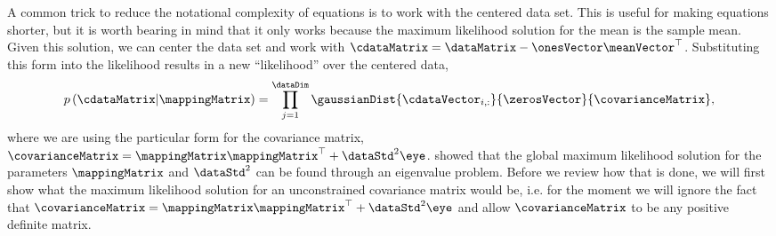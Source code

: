 A common trick to reduce the notational complexity of equations is to work with the centered data set. This is useful for making equations shorter, but it is worth bearing in mind that it only works because the maximum likelihood solution for the mean is the sample mean. Given this solution, we can center the
data set and work with $\cdataMatrix = \dataMatrix -
\onesVector\meanVector^\top$. Substituting this form into the likelihood results in a new ``likelihood'' over the centered data,
\[
p\left(\cdataMatrix|\mappingMatrix\right)=\prod_{j=1}^{\dataDim}\gaussianDist{\cdataVector_{i,:}}{\zerosVector}{\covarianceMatrix},
\]
where we are using the particular form for the covariance matrix, $
\covarianceMatrix=\mappingMatrix\mappingMatrix^{\top}+\dataStd^{2}\eye
$. \citet{Tipping:probpca99} showed that the global maximum likelihood
solution for the parameters $\mappingMatrix$ and $\dataStd^2$ can be
found through an eigenvalue problem. Before we review how that is
done, we will first show what the maximum likelihood solution for an
unconstrained covariance matrix would be, i.e. for the moment we will
ignore the fact that $
\covarianceMatrix=\mappingMatrix\mappingMatrix^{\top}+\dataStd^{2}\eye
$ and allow $\covarianceMatrix$ to be any positive definite matrix.

